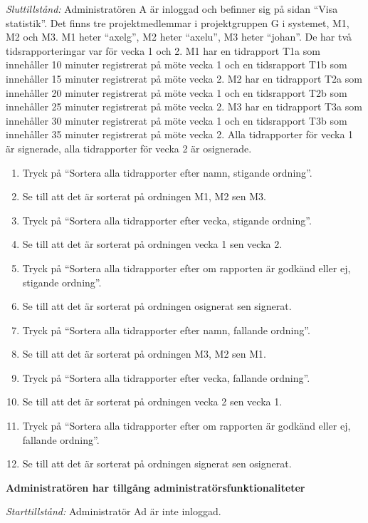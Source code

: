 \documentclass[a4paper]{article}
\begin{document}
\begin{ST}
\emph{Sluttillstånd:} Administratören A är inloggad och befinner sig på sidan ``Visa statistik''. Det finns tre projektmedlemmar i projektgruppen G i systemet, M1, M2 och M3. M1 heter ``axelg'', M2 heter ``axelu'', M3 heter ``johan''. De har två tidsrapporteringar var för vecka 1 och 2. M1 har en tidrapport T1a som innehåller 10 minuter registrerat på möte vecka 1 och en tidsrapport T1b som innehåller 15 minuter registrerat på möte vecka 2. M2 har en tidrapport T2a som innehåller 20 minuter registrerat på möte vecka 1 och en tidsrapport T2b som innehåller 25 minuter registrerat på möte vecka 2. M3 har en tidrapport T3a som innehåller 30 minuter registrerat på möte vecka 1 och en tidsrapport T3b som innehåller 35 minuter registrerat på möte vecka 2. Alla tidrapporter för vecka 1 är signerade, alla tidrapporter för vecka 2 är osignerade.

\begin{enumerate}
\item Tryck på ``Sortera alla tidrapporter efter namn, stigande ordning''.
\item Se till att det är sorterat på ordningen M1, M2 sen M3.
\item Tryck på ``Sortera alla tidrapporter efter vecka, stigande ordning''.
\item Se till att det är sorterat på ordningen vecka 1 sen vecka 2.
\item Tryck på ``Sortera alla tidrapporter efter om rapporten är godkänd eller ej, stigande ordning''.
\item Se till att det är sorterat på ordningen osignerat sen signerat.
\item Tryck på ``Sortera alla tidrapporter efter namn, fallande ordning''.
\item Se till att det är sorterat på ordningen M3, M2 sen M1.
\item Tryck på ``Sortera alla tidrapporter efter vecka, fallande ordning''.
\item Se till att det är sorterat på ordningen vecka 2 sen vecka 1.
\item Tryck på ``Sortera alla tidrapporter efter om rapporten är godkänd eller ej, fallande ordning''.
\item Se till att det är sorterat på ordningen signerat sen osignerat.
\end{enumerate}

\item \textbf{Administratören har tillgång administratörsfunktionaliteter} 

\emph{Starttillstånd:} Administratör Ad är inte inloggad.


\end{ST}
\end{document}
